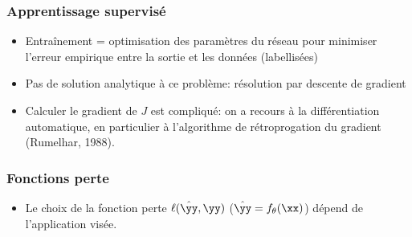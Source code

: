 \documentclass[9pt,table]{beamer} %
\begin{document}
\begin{frame}
\frametitle{Apprentissage supervisé}

\begin{itemize}[label=\tiny$\blacksquare$]
	\item \alert{Entraînement} = optimisation des paramètres du réseau pour minimiser l'\alert{erreur empirique} entre la sortie et les données (labellisées)
	
	\item Pas de solution analytique à ce problème: résolution par \alert{descente de gradient}
	
	\item Calculer le gradient de $J$ est compliqué: on a recours à la \alert{différentiation automatique}, en particulier à l'algorithme de \alert{rétroprogation du gradient} (Rumelhar, 1988).
\end{itemize}
\end{frame} 

\begin{frame}
\frametitle{Fonctions perte}

\begin{itemize}[label=\tiny$\blacksquare$]
	\item Le choix de la fonction perte $\ell(\hat{\yy},\yy)$ ($\hat{\yy} = f_\theta(\xx)$) dépend de l'application visée.
	\vfill
\end{itemize}

\end{frame}
\end{document}
